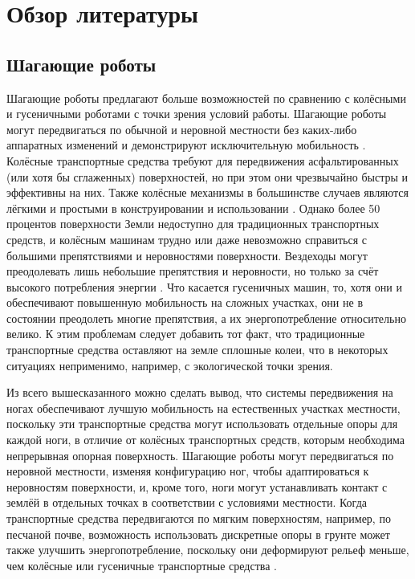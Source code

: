 \chapter{Обзор литературы}\label{ch:ch1}
\section{Шагающие роботы}\label{sec:ch1/sec1}

Шагающие роботы предлагают больше возможностей по сравнению с колёсными и гусеничными роботами с точки зрения условий работы. Шагающие роботы могут передвигаться по обычной и неровной местности без каких-либо аппаратных изменений и демонстрируют исключительную мобильность \cite{Silva2012}. Колёсные транспортные средства требуют для передвижения асфальтированных (или хотя бы сглаженных) поверхностей, но при этом они чрезвычайно быстры и эффективны на них. Также колёсные механизмы в большинстве случаев являются лёгкими и простыми в конструировании и использовании \cite{Zen2006}. Однако более 50 процентов поверхности Земли недоступно для традиционных транспортных средств, и колёсным машинам трудно или даже невозможно справиться с большими препятствиями и неровностями поверхности. Вездеходы могут преодолевать лишь небольшие препятствия и неровности, но только за счёт высокого потребления энергии \cite{Bekker1962}. Что касается гусеничных машин, то, хотя они и обеспечивают повышенную мобильность на сложных участках, они не в состоянии преодолеть многие препятствия, а их энергопотребление относительно велико. К этим проблемам следует добавить тот факт, что традиционные транспортные средства оставляют на земле сплошные колеи, что в некоторых ситуациях неприменимо, например, с экологической точки зрения. 

Из всего вышесказанного можно сделать вывод, что системы передвижения на ногах обеспечивают лучшую мобильность на естественных участках местности, поскольку эти транспортные средства могут использовать отдельные опоры для каждой ноги, в отличие от колёсных транспортных средств, которым необходима непрерывная опорная поверхность. Шагающие роботы могут передвигаться по неровной местности, изменяя конфигурацию ног, чтобы адаптироваться к неровностям поверхности, и, кроме того, ноги могут устанавливать контакт с землёй в отдельных точках в соответствии с условиями местности. Когда транспортные средства передвигаются по мягким поверхностям, например, по песчаной почве, возможность использовать дискретные опоры в грунте может также улучшить энергопотребление, поскольку они деформируют рельеф меньше, чем колёсные или гусеничные транспортные средства \cite{Iida2007}. 

